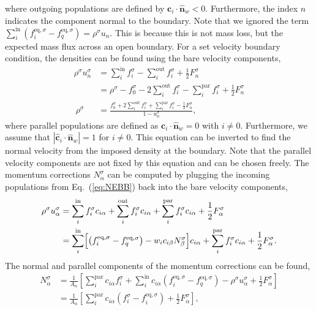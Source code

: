 \documentclass[fleqn,a4paper]{article} %
\numberwithin{equation}{section} %
\numberwithin{figure}{section} %
\numberwithin{table}{section} %
\numberwithin{algorithm}{section} %
\begin{document}
where outgoing populations are defined by $\bm{c}_i \cdot \hat{\bm{n}}_w < 0$. Furthermore, the index $n$ indicates the component normal to the boundary. Note that we ignored the term $\sum_i^\text{in}\left(f_i^{\text{eq},\sigma} - f_q^{\text{eq},\sigma}\right) = \rho^\sigma u_n$. This is because this is not mass loss, but the expected mass flux across an open boundary. For a set velocity boundary condition, the densities can be found using the bare velocity components, 
\begin{equation}
\begin{split}
    \rho^\sigma u_n^\sigma &= \sum_i^\text{in} f_i^\sigma - \sum_i^\text{out} f_i^\sigma + \frac{1}{2}F_n^\sigma\\
    &= \rho^\sigma - f_0^\sigma - 2\sum_i^\text{out}f_i^\sigma - \sum_i^\text{par}f_i^\sigma + \frac{1}{2}F_n^\sigma\\\
    \rho^\sigma &= \frac{f_0^\sigma + 2\sum_i^\text{out}f_i^\sigma + \sum_i^\text{par}f_i^\sigma - \frac{1}{2}F_n^\sigma}{1 - u_n^\sigma},
\end{split}
\end{equation}
where parallel populations are defined as $\bm{c}_i \cdot \hat{\bm{n}}_w = 0$ with $i\neq0$. Furthermore, we assume that $|\hat{\bm{c}}_i\cdot\hat{\bm{n}}_w| = 1$ for $i \neq 0$. This equation can be inverted to find the normal velocity from the imposed density at the boundary. Note that the parallel velocity components are not fixed by this equation and can be chosen freely. The momentum corrections $N_\alpha^\sigma$ can be computed by plugging the incoming populations from Eq.~(\ref{eq:NEBB}) back into the bare velocity components,
\begin{equation}
\begin{split}
    \rho^\sigma u^\sigma_{\alpha} &= \sum_i^\text{in} f_i^\sigma c_{i\alpha} + \sum_i^\text{out} f_i^\sigma c_{i\alpha} + \sum_i^\text{par} f_i^\sigma c_{i\alpha} + \frac{1}{2}F^\sigma_{\alpha}\\
    &= \sum_i^\text{in} \Bigl[\left(f_i^{\text{eq},\sigma} - f_q^{\text{eq},\sigma}\right) -  w_i c_{i\beta} N_\beta^\sigma\Bigr]c_{i\alpha} + \sum_i^\text{par}f_i^\sigma c_{i\alpha} + \frac{1}{2}F^\sigma_\alpha.
\end{split}
\end{equation}
The normal and parallel components of the momentum corrections can be found,
\begin{equation}
\begin{split}
    N_\alpha^\sigma &= \frac{1}{A_\alpha}\left[\sum_i^\text{par}c_{i\alpha}f_i^\sigma + \sum_i^\text{in}c_{i\alpha}\left(f_i^{\text{eq},\sigma} - f_q^{\text{eq},\sigma}\right) - \rho^\sigma u^\sigma_\alpha+ \frac{1}{2}F_\alpha^\sigma\right]\\
    &= \frac{1}{A_\alpha}\left[\sum_i^\text{par}c_{i\alpha}\left(f_i^\sigma - f_i^{\text{eq},\sigma}\right)+ \frac{1}{2}F_\alpha^\sigma\right],
\end{split}
\end{equation}
\end{document}
